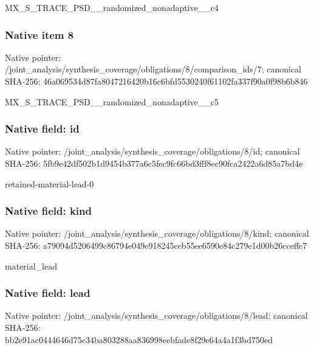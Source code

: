 \documentclass[10pt,a4paper]{article}
\begin{document}
\begingroup\raggedright\sloppy MX\_\allowbreak{}S\_\allowbreak{}TRACE\_\allowbreak{}PSD\_\allowbreak{}\_\allowbreak{}randomized\_\allowbreak{}nonadaptive\_\allowbreak{}\_\allowbreak{}c4\par\endgroup

\subsubsection{Native item 8}
Native pointer: /joint\_\allowbreak{}analysis/synthesis\_\allowbreak{}coverage/obligations/8/comparison\_\allowbreak{}ids/7; canonical SHA-256: 46a069534d87fa8047216420b16c6bfd5530240f61102fa337f90a0f98b6b846

\begingroup\raggedright\sloppy MX\_\allowbreak{}S\_\allowbreak{}TRACE\_\allowbreak{}PSD\_\allowbreak{}\_\allowbreak{}randomized\_\allowbreak{}nonadaptive\_\allowbreak{}\_\allowbreak{}c5\par\endgroup

\subsubsection{Native field: id}
Native pointer: /joint\_\allowbreak{}analysis/synthesis\_\allowbreak{}coverage/obligations/8/id; canonical SHA-256: 5fb9e42df502b1d9454b377a6c5fec9fc66bd3fff8ec90fca2422a6d85a7bd4e

\begingroup\raggedright\sloppy retained-material-lead-0\par\endgroup

\subsubsection{Native field: kind}
Native pointer: /joint\_\allowbreak{}analysis/synthesis\_\allowbreak{}coverage/obligations/8/kind; canonical SHA-256: a79094d5206499c86794e049e918245ccb55ee6590e84c279e1d00b26cceffc7

\begingroup\raggedright\sloppy material\_\allowbreak{}lead\par\endgroup

\subsubsection{Native field: lead}
Native pointer: /joint\_\allowbreak{}analysis/synthesis\_\allowbreak{}coverage/obligations/8/lead; canonical SHA-256: bb2e91ac0444646d75c34ba803288aa836998eebfade8f29e64a4a1f3bd750ed
\end{document}
